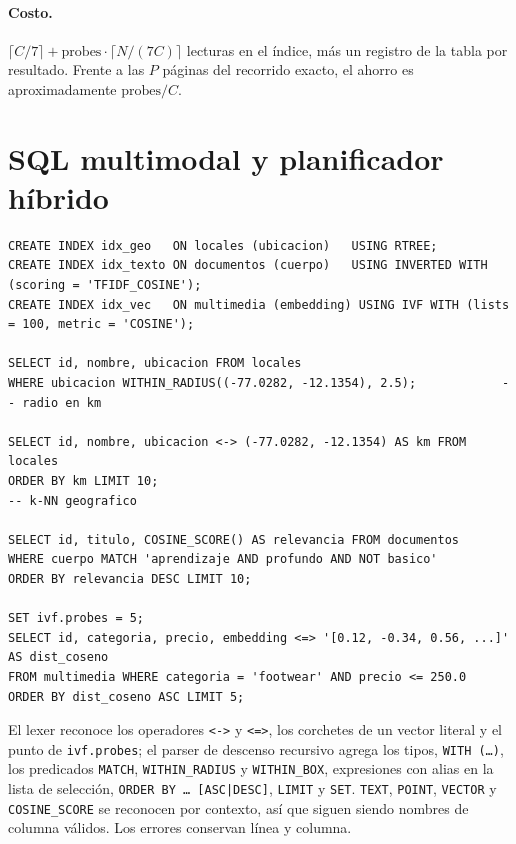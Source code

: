 \documentclass[11pt,a4paper]{article}
\newcommand{\code}[1]{\texttt{#1}}
\begin{document}
\paragraph{Costo.} $\lceil C/7\rceil + \text{probes}\cdot\lceil N/(7C)\rceil$ lecturas en el índice,
más un registro de la tabla por resultado. Frente a las $P$ páginas del recorrido exacto, el ahorro
es aproximadamente $\text{probes}/C$.

\section{SQL multimodal y planificador híbrido}
\label{sec:sql}

\begin{lstlisting}[style=sql]
CREATE INDEX idx_geo   ON locales (ubicacion)   USING RTREE;
CREATE INDEX idx_texto ON documentos (cuerpo)   USING INVERTED WITH (scoring = 'TFIDF_COSINE');
CREATE INDEX idx_vec   ON multimedia (embedding) USING IVF WITH (lists = 100, metric = 'COSINE');

SELECT id, nombre, ubicacion FROM locales
WHERE ubicacion WITHIN_RADIUS((-77.0282, -12.1354), 2.5);            -- radio en km

SELECT id, nombre, ubicacion <-> (-77.0282, -12.1354) AS km FROM locales
ORDER BY km LIMIT 10;                                                  -- k-NN geografico

SELECT id, titulo, COSINE_SCORE() AS relevancia FROM documentos
WHERE cuerpo MATCH 'aprendizaje AND profundo AND NOT basico'
ORDER BY relevancia DESC LIMIT 10;

SET ivf.probes = 5;
SELECT id, categoria, precio, embedding <=> '[0.12, -0.34, 0.56, ...]' AS dist_coseno
FROM multimedia WHERE categoria = 'footwear' AND precio <= 250.0
ORDER BY dist_coseno ASC LIMIT 5;
\end{lstlisting}

El lexer reconoce los operadores \code{<->} y \code{<=>}, los corchetes de un vector literal y el
punto de \code{ivf.probes}; el parser de descenso recursivo agrega los tipos, \code{WITH (\dots)},
los predicados \code{MATCH}, \code{WITHIN\_RADIUS} y \code{WITHIN\_BOX}, expresiones con alias en la
lista de selección, \code{ORDER BY \dots\ [ASC|DESC]}, \code{LIMIT} y \code{SET}. \code{TEXT},
\code{POINT}, \code{VECTOR} y \code{COSINE\_SCORE} se reconocen por contexto, así que siguen siendo
nombres de columna válidos. Los errores conservan línea y columna.
\end{document}
